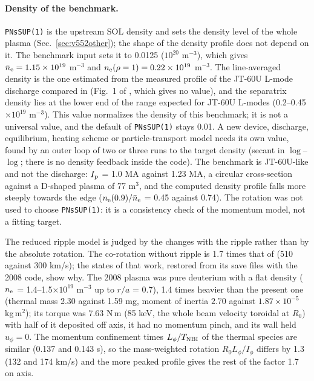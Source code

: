 \documentclass[11pt]{article}
\def\r#1{{\rm#1}}
\begin{document}
\paragraph{Density of the benchmark.}  \texttt{PNsSUP(1)} is the upstream SOL density and sets
the density level of the whole plasma (Sec.~\ref{sec:v552other}); the shape of the density profile
does not depend on it.  The benchmark input sets it to 0.0125 ($10^{20}$ m$^{-3}$), which gives
$\bar n_\r{e} = 1.15\times10^{19}$ m$^{-3}$ and $n_\r{e}(\rho=1) = 0.22\times10^{19}$ m$^{-3}$.  The
line-averaged density is the one estimated from the measured profile of the JT-60U L-mode
discharge compared in \cite{NF2008} (Fig.~1 of \cite{Yoshida2006}, which gives no value), and
the separatrix density lies at the lower end of the range expected for JT-60U L-modes
(0.2--0.45$\times10^{19}$ m$^{-3}$).  This value normalizes the density of this benchmark; it is
not a universal value, and the default of \texttt{PNsSUP(1)} stays 0.01.  A new device,
discharge, equilibrium, heating scheme or particle-transport model needs its own value, found
by an outer loop of two or three runs to the target density (secant in $\log$--$\log$; there is
no density feedback inside the code).  The benchmark is JT-60U-like and not the discharge:
$I_\r{p}$ = 1.0 MA against 1.23 MA, a circular cross-section against a D-shaped plasma of
77 m$^3$, and the computed density profile falls more steeply towards the edge
($n_\r{e}(0.9)/\bar n_\r{e}$ = 0.45 against 0.74).  The rotation was not used to choose
\texttt{PNsSUP(1)}: it is a consistency check of the momentum model, not a fitting target.

The reduced ripple model is judged by the changes with the ripple rather than by the
absolute rotation.  The co-rotation without ripple is 1.7 times that of \cite{NF2008}
(510 against 300 km/s); the
states of that work, restored from its save files with the 2008 code, show why.  The
2008 plasma was pure deuterium with a flat density ($n_\r{e}$ = 1.4--1.5$\times10^{19}$
m$^{-3}$ up to $r/a$ = 0.7), 1.4 times heavier than the present one (thermal mass 2.30
against 1.59 mg, moment of inertia $2.70$ against $1.87\times10^{-5}$ kg\,m$^2$); its
torque was 7.63 N\,m (85 keV, the whole beam velocity toroidal at $R_0$) with half of it
deposited off axis, it had no momentum pinch, and its wall held $u_\phi = 0$.  The
momentum confinement times $L_\phi/T_\r{NBI}$ of the thermal species are similar (0.137
and 0.143 s), so the mass-weighted rotation $R_0L_\phi/I_\phi$ differs by 1.3 (132 and 174
km/s) and the more peaked profile gives the rest of the factor 1.7 on axis.
\end{document}
